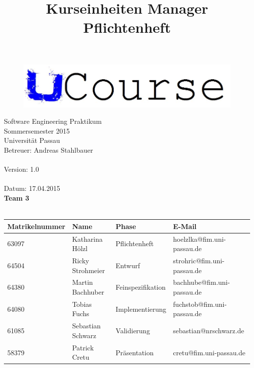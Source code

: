 \documentclass[a4paper]{scrreprt}
\begin{document}
	\thispagestyle{plain}

\begin{titlepage}
    \begin{center}
\begin{figure}[th]
\centering
\includegraphics[width=0.6\linewidth]{logo/name_blau.jpg}
\end{figure}

    	\begin{title}
        	\title{\Huge{\textbf{Kurseinheiten Manager \\ Pflichtenheft\\}}}

		\end{title}
		\hspace{3cm}

        	Software Engineering Praktikum \\
        	Sommersemester 2015\\
        	Universität Passau\\


        	Betreuer: Andreas Stahlbauer\\
        	\hspace{1,5cm}\\
        	Version: 1.0 \\
        	\hspace{1,5cm}\\
        	Datum: 17.04.2015\\[50pt]
        	\textbf{Team 3} \\
            \ \\
    
        
        
        \begin{tabular}{ | l | l | l | l |}
            \hline
            \textbf{Matrikelnummer} & \textbf{Name} & \textbf{Phase} & \textbf{E-Mail}  \\ \hline
            63097 & Katharina Hölzl & Pflichtenheft & hoelzlka@fim.uni-passau.de \\ \hline
            64504 & Ricky Strohmeier& Entwurf & strohric@fim.uni-passau.de  \\ \hline
            64380 & Martin Bachhuber & Feinspezifikation  & bachhube@fim.uni-passau.de \\ \hline
            64080 & Tobias Fuchs & Implementierung  &  fuchstob@fim.uni-passau.de\\ \hline
            61085 & Sebastian Schwarz & Validierung & sebastian@nrschwarz.de \\ \hline  
            58379 & Patrick Cretu  &  Präsentation & cretu@fim.uni-passau.de \\ \hline
        \end{tabular}
    \end{center}
\end{titlepage}
 
\end{document}
